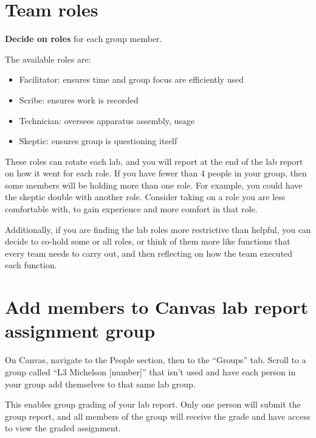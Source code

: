 \section{Team roles}

\begin{steps}
	\item \textbf{Decide on roles} for each group member.
\end{steps}

The available roles are:

\begin{itemize}
	\item Facilitator: ensures time and group focus are efficiently used
	\item Scribe: ensures work is recorded
	\item Technician: oversees apparatus assembly, usage
	\item Skeptic: ensures group is questioning itself
\end{itemize}

These roles can rotate each lab, and you will report at the end of the lab report on how it went for each role. If you have fewer than 4 people in your group, then some members will be holding more than one role. For example, you could have the skeptic double with another role. Consider taking on a role you are less comfortable with, to gain experience and more comfort in that role.

Additionally, if you are finding the lab roles more restrictive than helpful, you can decide to co-hold some or all roles, or think of them more like functions that every team needs to carry out, and then reflecting on how the team executed each function.

\section{Add members to Canvas lab report assignment group}

\begin{steps}
	\item On Canvas, navigate to the People section, then to the ``Groups'' tab. Scroll to a group called ``L3 Michelson [number]'' that isn't used and have each person in your group add themselves to that same lab group.
\end{steps}

This enables group grading of your lab report. Only one person will submit the group report, and all members of the group will receive the grade and have access to view the graded assignment.

